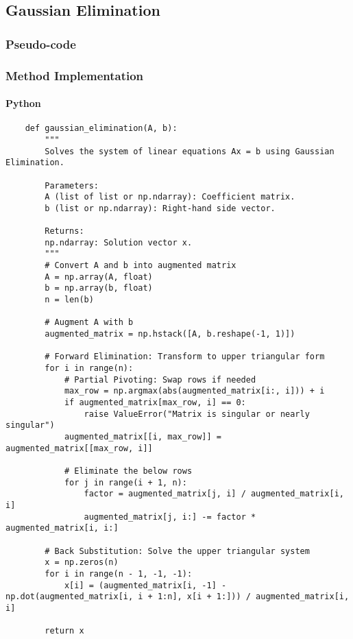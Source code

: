 \documentclass{article}
\begin{document}
    \subsection{Gaussian Elimination}
        \subsubsection{Pseudo-code}

        \subsubsection{Method Implementation}
            \paragraph{Python}
                \begin{verbatim}
    def gaussian_elimination(A, b):
        """
        Solves the system of linear equations Ax = b using Gaussian Elimination.

        Parameters:
        A (list of list or np.ndarray): Coefficient matrix.
        b (list or np.ndarray): Right-hand side vector.

        Returns:
        np.ndarray: Solution vector x.
        """
        # Convert A and b into augmented matrix
        A = np.array(A, float)
        b = np.array(b, float)
        n = len(b)

        # Augment A with b
        augmented_matrix = np.hstack([A, b.reshape(-1, 1)])

        # Forward Elimination: Transform to upper triangular form
        for i in range(n):
            # Partial Pivoting: Swap rows if needed
            max_row = np.argmax(abs(augmented_matrix[i:, i])) + i
            if augmented_matrix[max_row, i] == 0:
                raise ValueError("Matrix is singular or nearly singular")
            augmented_matrix[[i, max_row]] = augmented_matrix[[max_row, i]]

            # Eliminate the below rows
            for j in range(i + 1, n):
                factor = augmented_matrix[j, i] / augmented_matrix[i, i]
                augmented_matrix[j, i:] -= factor * augmented_matrix[i, i:]

        # Back Substitution: Solve the upper triangular system
        x = np.zeros(n)
        for i in range(n - 1, -1, -1):
            x[i] = (augmented_matrix[i, -1] - np.dot(augmented_matrix[i, i + 1:n], x[i + 1:])) / augmented_matrix[i, i]

        return x
                \end{verbatim}
\end{document}
